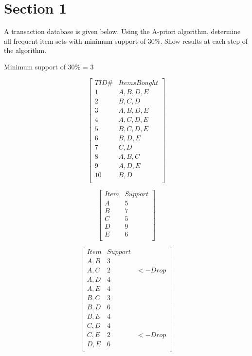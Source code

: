 \documentclass{report}
\begin{document}
\chapter{Section 1}

A transaction database is given below. Using the A-priori algorithm, determine all frequent item-sets with minimum support of 30\%. Show results at each step of the algorithm.

Minimum support of 30\% = 3

\[
  \begin{bmatrix}
    TID\# & Items Bought \\
    1     & A, B, D, E   \\
    2     & B, C, D      \\
    3     & A, B, D, E   \\
    4     & A, C, D, E   \\
    5     & B, C, D, E   \\
    6     & B, D, E      \\
    7     & C, D         \\
    8     & A, B, C      \\
    9     & A, D, E      \\
    10    & B, D         \\
  \end{bmatrix}
\]

\[
  \begin{bmatrix}
    Item & Support \\
    {A}  & 5       \\
    {B}  & 7       \\
    {C}  & 5       \\
    {D}  & 9       \\
    {E}  & 6       \\
  \end{bmatrix}
\]

\[
  \begin{bmatrix}
    Item    & Support \\
    {A, B}  & 3       \\
    {A, C}  & 2       & <- Drop \\
    {A, D}  & 4       \\
    {A, E}  & 4       \\
    {B, C}  & 3       \\
    {B, D}  & 6       \\
    {B, E}  & 4       \\
    {C, D}  & 4       \\
    {C, E}  & 2       & <- Drop \\
    {D, E}  & 6       \\
  \end{bmatrix}
\]
\end{document}

